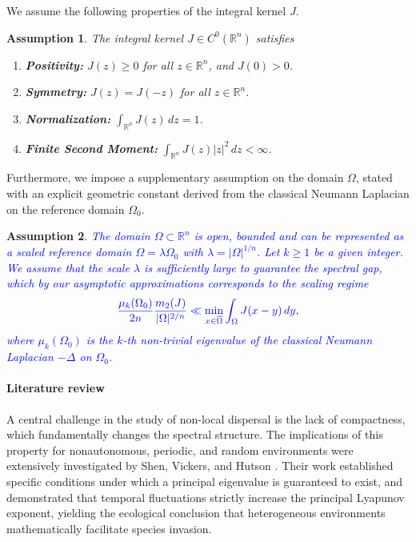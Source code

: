 \documentclass[12pt, a4paper]{article}
\newcommand{\revision}[1]{\textcolor{blue}{#1}}
\theoremstyle{break}
\theoremstyle{break}
\theoremstyle{break}
\newtheorem{asm}{Assumption}[section]
\theoremstyle{break}
\theoremstyle{break}
\theoremstyle{break}
\theoremstyle{break}
\theoremstyle{break}
\theoremstyle{break}
\begin{document}
We assume the following properties of the integral kernel $J$.

\begin{asm} 
    \label{asm:KernelProperties}
    The integral kernel $J \in C^0(\mathbb{R}^n)$ satisfies
    \begin{enumerate}[label=(\textit{J\arabic*})]
        \item \textbf{Positivity:} $J(z) \geq 0$ for all $z \in \mathbb{R}^n$, and $J(0) > 0$.
        \item \textbf{Symmetry:} $J(z) = J(-z)$ for all $z \in \mathbb{R}^n$.
        \item \textbf{Normalization:} $\int_{\mathbb{R}^n} J(z) \, dz = 1$.
        \item \textbf{Finite Second Moment:} $\int_{\mathbb{R}^n} J(z)|z|^2 \, dz < \infty$.
    \end{enumerate}
\end{asm}

Furthermore, we impose a supplementary assumption on the domain $\Omega$, stated with an explicit geometric constant derived from the classical Neumann Laplacian on the reference domain $\Omega_0$.

\begin{asm}
    \label{asm:DomainProperties_3}
    \revision{The domain $\Omega \subset \mathbb{R}^n$ is open, bounded and can be represented as a scaled reference domain $\Omega = \lambda \Omega_0$ with $\lambda = |\Omega|^{1/n}$. Let $k \geq 1$ be a given integer. We assume that the scale $\lambda$ is sufficiently large to guarantee the spectral gap, which by our asymptotic approximations corresponds to the scaling regime}
    \begin{equation} \label{eq:variance_condition_k}
        \revision{\frac{\mu_k(\Omega_0)}{2n}\frac{m_2(J)}{|\Omega|^{2/n}} \ll \min_{x \in \overline{\Omega}} \int_\Omega J(x-y) \, dy,}
    \end{equation}
    \revision{where $\mu_k(\Omega_0)$ is the $k$-th non-trivial eigenvalue of the classical Neumann Laplacian $-\Delta$ on $\Omega_0$.}
\end{asm}

\paragraph{Literature review}

A central challenge in the study of non-local dispersal is the lack of compactness, which fundamentally changes the spectral structure. The implications of this property for nonautonomous, periodic, and random environments were extensively investigated by Shen, Vickers, and Hutson \cite{ShenVickers2007, HutsonShenVickers2008}. Their work established specific conditions under which a principal eigenvalue is guaranteed to exist, and demonstrated that temporal fluctuations strictly increase the principal Lyapunov exponent, yielding the ecological conclusion that heterogeneous environments mathematically facilitate species invasion.
\end{document}
